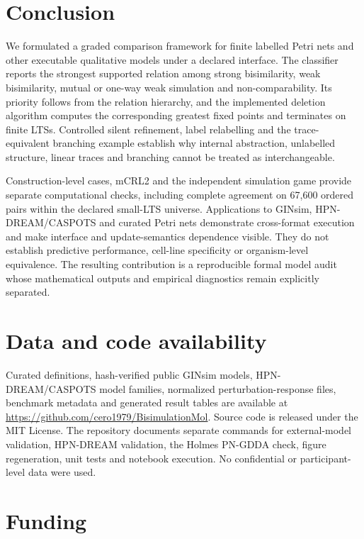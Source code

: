 \documentclass[JMCS,submit]{resources/ISRP}
\theoremstyle{definition}
\theoremstyle{remark}
\numberwithin{equation}{section}
\begin{document}
\section{Conclusion}\label{sec:conclusion}

We formulated a graded comparison framework for finite labelled Petri nets and
other executable qualitative models under a declared interface. The classifier
reports the strongest supported relation among strong bisimilarity, weak
bisimilarity, mutual or one-way weak simulation and non-comparability. Its
priority follows from the relation hierarchy, and the implemented deletion
algorithm computes the corresponding greatest fixed points and terminates on
finite LTSs. Controlled silent refinement, label relabelling and the
trace-equivalent branching example establish why internal abstraction,
unlabelled structure, linear traces and branching cannot be treated as
interchangeable.

Construction-level cases, mCRL2 and the independent simulation game provide
separate computational checks, including complete agreement on 67,600 ordered
pairs within the declared small-LTS universe. Applications to GINsim,
HPN-DREAM/CASPOTS and curated Petri nets demonstrate cross-format execution and
make interface and update-semantics dependence visible. They do not establish
predictive performance, cell-line specificity or organism-level equivalence.
The resulting contribution is a reproducible formal model audit whose
mathematical outputs and empirical diagnostics remain explicitly separated.

\section*{Data and code availability}

Curated definitions, hash-verified public GINsim models, HPN-DREAM/CASPOTS model
families, normalized perturbation-response files, benchmark metadata and generated
result tables are available at
\url{https://github.com/cero1979/BisimulationMol}. Source code is released under
the MIT License. The repository documents separate commands for external-model
validation, HPN-DREAM validation, the Holmes PN-GDDA check, figure regeneration,
unit tests and notebook execution. No confidential or participant-level data were
used.

\section*{Funding}
\end{document}
